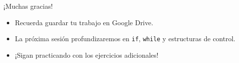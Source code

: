 \documentclass[10pt]{beamer}
\begin{document}
\begin{frame}
  \Huge{\centerline{¡Muchas gracias!}}
  \vspace{0.3cm}
  \normalsize
  \begin{itemize}
    \item Recuerda guardar tu trabajo en Google Drive.
    \item La próxima sesión profundizaremos en \texttt{if}, \texttt{while} y estructuras de control.
    \item ¡Sigan practicando con los ejercicios adicionales!
  \end{itemize}
\end{frame}
\end{document}
